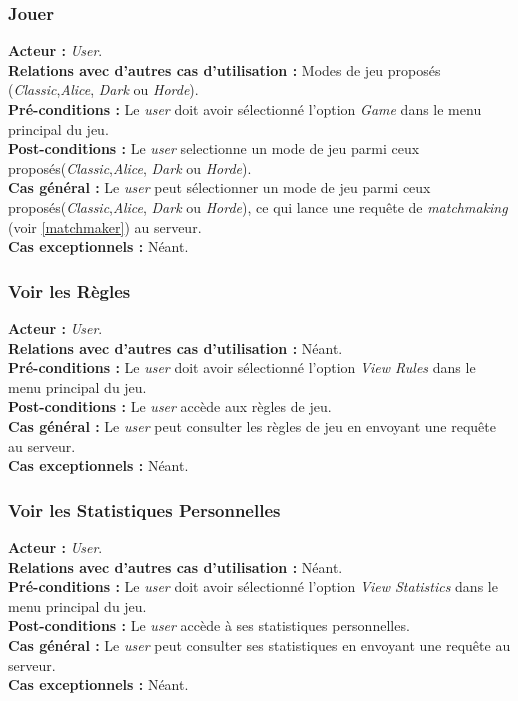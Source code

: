 \documentclass[10pt, a4paper]{article}
\begin{document}
\subsubsection{Jouer}
\textbf{Acteur :} \textit{User}.\\
\textbf{Relations avec d'autres cas d'utilisation :} Modes de jeu proposés (\textit{Classic},\textit{Alice}, \textit{Dark} ou \textit{Horde}).\\
\textbf{Pré-conditions :} Le \textit{user} doit avoir sélectionné l'option \textit{Game} dans le menu principal du jeu.\\
\textbf{Post-conditions :} Le \textit{user} selectionne un mode de jeu parmi ceux proposés(\textit{Classic},\textit{Alice}, \textit{Dark} ou \textit{Horde}).\\
\textbf{Cas général :} Le \textit{user} peut sélectionner un mode de jeu parmi ceux proposés(\textit{Classic},\textit{Alice}, \textit{Dark} ou \textit{Horde}), ce qui lance une requête de \textit{matchmaking} (voir \ref{matchmaker}) au serveur.\\
\textbf{Cas exceptionnels :} Néant.



\subsubsection{Voir les Règles}
\textbf{Acteur :} \textit{User}.\\
\textbf{Relations avec d'autres cas d'utilisation :} Néant.\\
\textbf{Pré-conditions :} Le \textit{user} doit avoir sélectionné l'option \textit{View Rules} dans le menu principal du jeu.\\
\textbf{Post-conditions :} Le \textit{user} accède aux règles de jeu.\\
\textbf{Cas général :} Le \textit{user} peut consulter les règles de jeu en envoyant une requête au serveur.\\
\textbf{Cas exceptionnels :} Néant.

\subsubsection{Voir les Statistiques Personnelles}
\textbf{Acteur :} \textit{User}.\\
\textbf{Relations avec d'autres cas d'utilisation :} Néant.\\
\textbf{Pré-conditions :} Le \textit{user} doit avoir sélectionné l'option \textit{View Statistics} dans le menu principal du jeu.\\
\textbf{Post-conditions :} Le \textit{user} accède à ses statistiques personnelles.\\
\textbf{Cas général :} Le \textit{user} peut consulter ses statistiques en envoyant une requête au serveur.\\
\textbf{Cas exceptionnels :} Néant.
\end{document}
